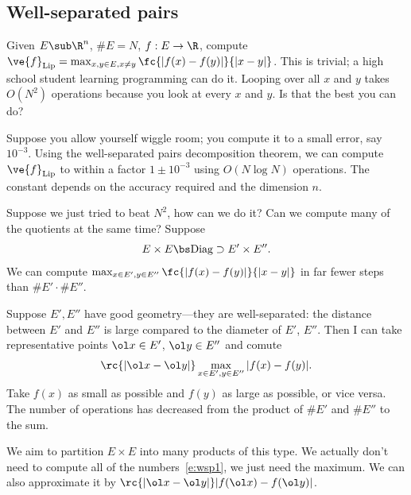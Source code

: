 \subsection{Well-separated pairs}

Given $E\sub \R^n$, $\# E=N$, $f:E\to \R$, compute $\ve{f}_{\text{Lip}} = \max_{x,y\in E,x\ne y} \fc{|f(x)-f(y)|}{|x-y|}$. This is trivial; a high school student learning programming can do it. Looping over all $x$ and $y$ takes $O(N^2)$ operations because you look at every $x$ and $y$. Is that the best you can do?

Suppose you allow yourself wiggle room; you compute it to a small error, say $10^{-3}$. Using the well-separated pairs decomposition theorem, we can compute $\ve{f}_{\text{Lip}}$ to within a factor $1\pm 10^{-3}$ using $O(N\log N)$ operations. The constant depends on the accuracy required and the dimension $n$.

Suppose we just tried to beat $N^2$, how can we do it? Can we compute many of the quotients at the same time? Suppose
\begin{align}
E\times E \bs \text{Diag} \supset E'\times E''.
\end{align}
We can compute $\max_{x\in E',y\in E''}\fc{|f(x)-f(y)|}{|x-y|}$ in far fewer steps than $\# E' \cdot \# E''$.  

Suppose $E',E''$ have good geometry---they are well-separated: the distance between $E'$ and $E''$ is large compared to the diameter of $E'$, $E''$. Then I can take representative points $\ol x\in E'$, $\ol y\in E''$ and comute
\begin{align}\label{e:wsp1}
\rc{|\ol x - \ol y|}\max_{x\in E',y\in E''} |f(x)-f(y)|. 
\end{align}
Take $f(x)$ as small as possible and $f(y)$ as large as possible, or vice versa. The number of operations has decreased from the product of $\# E'$ and $\# E''$ to the sum. 

We aim to partition $E\times E$ into many products of this type. We actually don't need to compute all of the numbers~\eqref{e:wsp1}, we just need the maximum. We can also approximate it by $\rc{|\ol x-\ol y|}|f(\ol x)-f(\ol y)|$.

